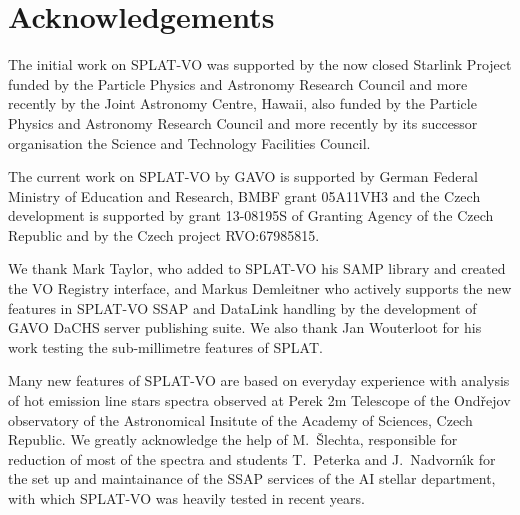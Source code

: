 \documentclass[final,authoryear,5p,times,twocolumn]{elsarticle}
\begin{document}
\section*{Acknowledgements}

The initial work on SPLAT-VO was supported
by the now closed Starlink Project funded by the Particle Physics and
Astronomy Research Council and more recently by the Joint Astronomy
Centre, Hawaii, also funded by the Particle Physics and Astronomy
Research Council and more recently by its successor organisation the
Science and Technology Facilities Council.

The current work on SPLAT-VO by GAVO is supported by German Federal
Ministry of Education and Research, BMBF grant 05A11VH3 and the Czech
development is supported by grant 13-08195S of Granting Agency of the
Czech Republic and by the Czech project RVO:67985815.

We thank Mark Taylor, who added to
SPLAT-VO his SAMP library and created the VO Registry interface, and
Markus Demleitner who actively supports the new features in SPLAT-VO SSAP
and DataLink handling by the development of GAVO DaCHS server publishing suite.
We also thank Jan Wouterloot for his work testing the sub-millimetre
features of SPLAT.

Many new features of SPLAT-VO are based on everyday experience with
analysis of hot emission line stars spectra observed at Perek 2m
Telescope of the Ond\v{r}ejov observatory of the Astronomical Insitute
of the Academy of Sciences, Czech Republic. We greatly acknowledge the
help of M.~\v{S}lechta, responsible for reduction of most of the
spectra and students T.~Peterka and J.~Nadvorn\'\i{}k for the set up
and maintainance of the SSAP services of the AI stellar department,
with which SPLAT-VO was heavily tested in recent years.









\end{document}
